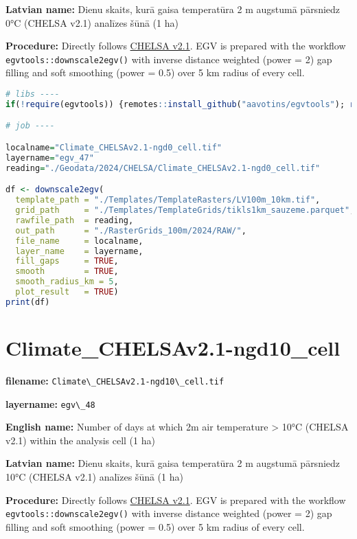 \documentclass[
]{book}
\newcommand{\passthrough}[1]{#1}
\begin{document}
\textbf{Latvian name:} Dienu skaits, kurā gaisa temperatūra 2 m augstumā pārsniedz 0°C (CHELSA v2.1) analīzes šūnā (1 ha)

\textbf{Procedure:} Directly follows \hyperref[Ch04.11]{CHELSA v2.1}. EGV is prepared with the
workflow \passthrough{\lstinline!egvtools::downscale2egv()!} with inverse distance weighted (power = 2)
gap filling and soft smoothing (power = 0.5) over 5 km radius of every cell.

\begin{lstlisting}[language=R]
# libs ----
if(!require(egvtools)) {remotes::install_github("aavotins/egvtools"); require(egvtools)}

# job ----

localname="Climate_CHELSAv2.1-ngd0_cell.tif"
layername="egv_47"
reading="./Geodata/2024/CHELSA/Climate_CHELSAv2.1-ngd0_cell.tif"

df <- downscale2egv(
  template_path = "./Templates/TemplateRasters/LV100m_10km.tif",
  grid_path     = "./Templates/TemplateGrids/tikls1km_sauzeme.parquet",
  rawfile_path  = reading,
  out_path      = "./RasterGrids_100m/2024/RAW/",
  file_name     = localname,
  layer_name    = layername,
  fill_gaps     = TRUE,
  smooth        = TRUE,
  smooth_radius_km = 5,
  plot_result   = TRUE)
print(df)
\end{lstlisting}

\section{Climate\_CHELSAv2.1-ngd10\_cell}\label{ch06.048}

\textbf{filename:} \passthrough{\lstinline!Climate\_CHELSAv2.1-ngd10\_cell.tif!}

\textbf{layername:} \passthrough{\lstinline!egv\_48!}

\textbf{English name:} Number of days at which 2m air temperature \textgreater{} 10°C (CHELSA v2.1) within the analysis cell (1 ha)

\textbf{Latvian name:} Dienu skaits, kurā gaisa temperatūra 2 m augstumā pārsniedz 10°C (CHELSA v2.1) analīzes šūnā (1 ha)

\textbf{Procedure:} Directly follows \hyperref[Ch04.11]{CHELSA v2.1}. EGV is prepared with the
workflow \passthrough{\lstinline!egvtools::downscale2egv()!} with inverse distance weighted (power = 2)
gap filling and soft smoothing (power = 0.5) over 5 km radius of every cell.
\end{document}
